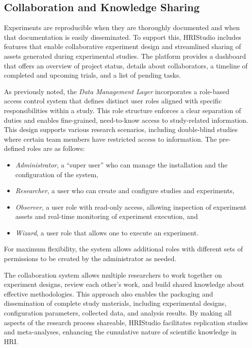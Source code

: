 \documentclass[letterpaper, 10 pt, conference]{subfiles/ieeeconf}
\begin{document}
\subsection{Collaboration and Knowledge Sharing}

Experiments are reproducible when they are thoroughly documented and when that documentation is easily disseminated. To support this, HRIStudio includes features that enable collaborative experiment design and streamlined sharing of assets generated during experimental studies. The platform provides a dashboard that offers an overview of project status, details about collaborators, a timeline of completed and upcoming trials, and a list of pending tasks.

As previously noted, the \emph{Data Management Layer} incorporates a role-based access control system that defines distinct user roles aligned with specific responsibilities within a study. This role structure enforces a clear separation of duties and enables fine-grained, need-to-know access to study-related information. This design supports various research scenarios, including double-blind studies where certain team members have restricted access to information. The pre-defined roles are as follows:
\begin{itemize}
\item \emph{Administrator}, a ``super user'' who can manage the installation and the configuration of the system, 
\item \emph{Researcher}, a user who can create and configure studies and experiments,
\item \emph{Observer}, a user role with read-only access, allowing inspection of experiment assets and real-time monitoring of experiment execution, and
\item \emph{Wizard}, a user role that allows one to execute an experiment.
\end{itemize}
For maximum flexibility, the system allows additional roles with different sets of permissions to be created by the administrator as needed.
 
The collaboration system allows multiple researchers to work together on experiment designs, review each other's work, and build shared knowledge about effective methodologies. This approach also enables the packaging and dissemination of complete study materials, including experimental designs, configuration parameters, collected data, and analysis results. By making all aspects of the research process shareable, HRIStudio facilitates replication studies and meta-analyses, enhancing the cumulative nature of scientific knowledge in HRI.
\end{document}

